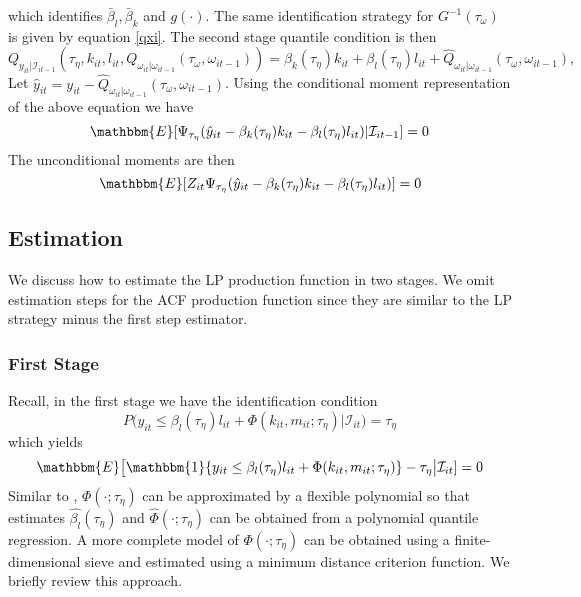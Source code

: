 \documentclass[11pt]{article}
\begin{document}
which identifies $\bar{\beta}_{l}, \bar{\beta}_{k}$ and $g(\cdot)$. The same identification strategy for $G^{-1}(\tau_{\omega})$ is given by equation \eqref{qxi}. The second stage quantile condition is then
\begin{equation*}
Q_{y_{it}|\mathcal{I}_{it-1}}(\tau_{\eta}, k_{it}, l_{it}, Q_{\omega_{it}|\omega_{it-1}}(\tau_{\omega}, \omega_{it-1}))=\beta_{k}(\tau_{\eta})k_{it}+\beta_{l}(\tau_{\eta})l_{it}+\hat{Q}_{\omega_{it}|\omega_{it-1}}(\tau_{\omega}, \omega_{it-1}),
\end{equation*}
Let $\hat{y}_{it}=y_{it}-\hat{Q}_{\omega_{it}|\omega_{it-1}}(\tau_{\omega}, \omega_{it-1})$. Using the conditional moment representation of the above equation we have
\begin{equation}
\mathbbm{E}[\Psi_{\tau_{\eta}}(\hat{y}_{it}-\beta_{k}(\tau_{\eta})k_{it}-\beta_{l}(\tau_{\eta})l_{it})|\mathcal{I}_{it-1}]=0
\end{equation}
The unconditional moments are then
\begin{equation}\label{capitalident}
\mathbbm{E}[Z_{it}\Psi_{\tau_{\eta}}(\hat{y}_{it}-\beta_{k}(\tau_{\eta})k_{it}-\beta_{l}(\tau_{\eta})l_{it})]=0
\end{equation}

\subsection{Estimation}
We discuss how to estimate the LP production function in two stages. We omit estimation steps for the ACF production function since they are similar to the LP strategy minus the first step estimator. 
\subsubsection*{First Stage}
Recall, in the first stage we have the identification condition
\begin{equation} 
	P\big(y_{it}\leq \beta_{l}(\tau_{\eta})l_{it}+\Phi(k_{it}, m_{it}; \tau_{\eta})\big|\mathcal{I}_{it})=\tau_{\eta}
\end{equation}
which yields
\begin{equation} 
	\mathbbm{E}\big[\mathbbm{1}\{y_{it}\leq \beta_{l}(\tau_{\eta})l_{it}+\Phi(k_{it}, m_{it}; \tau_{\eta})\}-\tau_{\eta}\big|\mathcal{I}_{it}]=0
\end{equation}
Similar to \cite{Olley1996}, $\Phi(\cdot;\tau_{\eta})$ can be approximated by a flexible polynomial so that estimates $\hat{\beta_{l}}(\tau_{\eta})$ and $\hat{\Phi}(\cdot;\tau_{\eta})$ can be obtained from a polynomial quantile regression. A more complete model of $\Phi(\cdot;\tau_{\eta})$ can be obtained using a finite-dimensional sieve and estimated using a minimum distance criterion function. We briefly review this approach.\\
\end{document}
